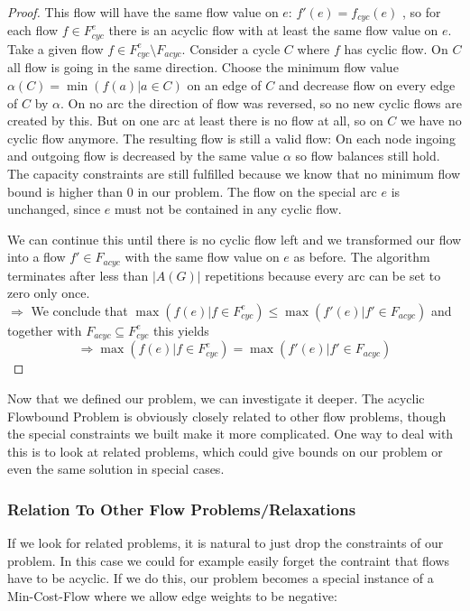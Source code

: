 \begin{proof}
This flow will have the same flow value on $e$: $f'(e)=f_{cyc}(e)$ , so for each flow $f\in F_{cyc}^e$ there is an 
acyclic flow with at least the same flow value on $e$.\\
Take a given flow $f\in F_{cyc}^e\setminus F_{acyc}$. Consider a cycle $C$ where $f$ has cyclic flow. On $C$ all flow 
is going in the same direction. Choose the minimum flow value $\alpha(C)=\min(f(a)|a\in C)$ on an edge of $C$ and 
decrease flow on every edge of $C$ by $\alpha$. On no arc the direction of flow was reversed, so no new cyclic flows
are created by this. But on one arc at least there is no flow at all, so on $C$ we have no cyclic flow anymore. The 
resulting flow is still a valid flow: On each node ingoing and outgoing flow is decreased by the same value $\alpha$ so 
flow balances still hold. The capacity constraints are still fulfilled because we know that no minimum flow bound is 
higher than 0 in our problem. The flow on the special arc $e$ is unchanged, since $e$ must not be contained in any 
cyclic flow.

We can continue this until there is no cyclic flow left and we transformed our flow into a flow $f'\in F_{acyc}$ with 
the same flow value on $e$ as before. The algorithm terminates after less than $|A(G)|$ repetitions because every arc 
can be set to zero only once.\\
$\Rightarrow $ We conclude that $\max(f(e)|f\in F_{cyc}^e)\le \max(f'(e)|f'\in F_{acyc})$ and together with 
$F_{acyc}\subseteq F_{cyc}^e $ this yields
$$\Rightarrow \max(f(e)|f\in F_{cyc}^e)= \max(f'(e)|f'\in F_{acyc}) $$
\end{proof}


Now that we defined our problem, we can investigate it deeper. The acyclic Flowbound Problem is obviously closely 
related to other flow problems, 
though the special constraints we built make it more complicated. One way to deal with this is to look at related 
problems, which could give bounds on our problem or even the same solution in special cases.

\subsubsection{Relation To Other Flow Problems/Relaxations}

If we look for related problems, it is natural to just drop the constraints of our problem. In this case we could for 
example easily forget the contraint that flows have to be acyclic. If we do this, our problem becomes a special 
instance of a Min-Cost-Flow where we allow edge weights to be negative:

